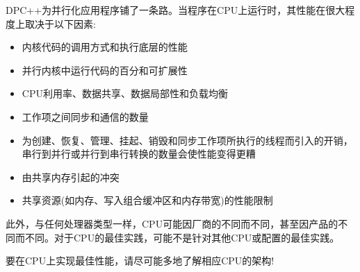 DPC++为并行化应用程序铺了一条路。当程序在CPU上运行时，其性能在很大程度上取决于以下因素:\par

\begin{itemize}
	\item 内核代码的调用方式和执行底层的性能
	\item 并行内核中运行代码的百分和可扩展性
	\item CPU利用率、数据共享、数据局部性和负载均衡
	\item 工作项之间同步和通信的数量
	\item 为创建、恢复、管理、挂起、销毁和同步工作项所执行的线程而引入的开销，串行到并行或并行到串行转换的数量会使性能变得更糟
	\item 由共享内存引起的冲突
	\item 共享资源(如内存、写入组合缓冲区和内存带宽)的性能限制
\end{itemize}

此外，与任何处理器类型一样，CPU可能因厂商的不同而不同，甚至因产品的不同而不同。对于CPU的最佳实践，可能不是针对其他CPU或配置的最佳实践。\par

\begin{tcolorbox}[colback=red!5!white,colframe=red!75!black]
要在CPU上实现最佳性能，请尽可能多地了解相应CPU的架构!
\end{tcolorbox}











